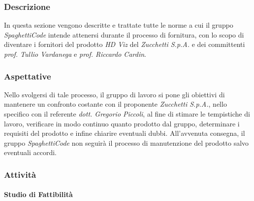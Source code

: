 \subsubsection{Descrizione}

In questa sezione vengono descritte e trattate tutte le norme a cui il gruppo \emph{SpaghettiCode} intende attenersi
durante il processo di fornitura, con lo scopo di diventare i fornitori del prodotto \emph{HD Viz} del
 \emph{Zucchetti S.p.A.} e dei committenti \emph{prof. Tullio Vardanega} e
\emph{prof. Riccardo Cardin}.

\subsubsection{Aspettative}

Nello svolgersi di tale processo, il gruppo di lavoro si pone gli obiettivi di mantenere un confronto costante con il
proponente \emph{Zucchetti S.p.A.}, nello specifico con il referente \emph{dott. Gregorio Piccoli}, al fine di stimare
le tempistiche di lavoro, verificare in modo continuo quanto prodotto dal gruppo, determinare i requisiti del prodotto
e infine chiarire eventuali dubbi.
All'avvenuta consegna, il gruppo \emph{SpaghettiCode} non seguirà il processo di manutenzione del prodotto salvo
eventuali accordi.

\subsubsection{Attività}

\paragraph{Studio di Fattibilità}
\label{par:studio_fattibilita}

